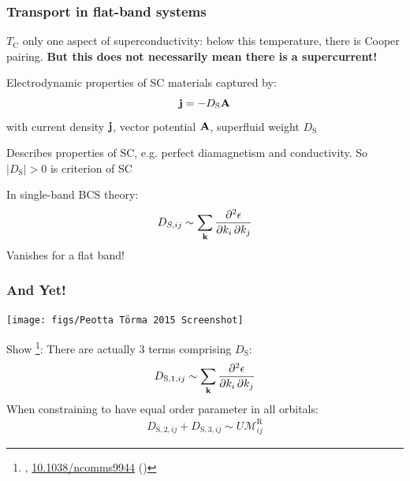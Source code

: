 \documentclass[aspectratio=169]{beamer}
\begin{document}
\begin{frame}
	\frametitle{Transport in flat-band systems}
	
	\(T_{\textrm{C}}\) only one aspect of superconductivity: below this temperature, there is Cooper pairing.
	\textbf{But this does not necessarily mean there is a supercurrent!}
	
	Electrodynamic properties of SC materials captured by:
	\begin{equation}
		\mathbf{j} = -D_{\textrm{S}} \mathbf{A}
	\end{equation}
	with current density \(\mathbf{j}\), vector potential \(\mathbf{A}\), superfluid weight \(D_{\textrm{S}}\)
	
	Describes properties of SC, e.g. perfect diamagnetism and conductivity.
	So \(\vert D_{\textrm{S}} \vert > 0\) is criterion of SC
	
	In single-band BCS theory:
	\begin{equation}
		D_{S, ij} \sim \sum_{\mathbf{k}} \pdv{\epsilon}{k_i,k_j}
	\end{equation}
	Vanishes for a flat band!
\end{frame}


\begin{frame}
	\frametitle{And Yet!}
	
	\begin{center}
		\texttt{[image: figs/Peotta Törma 2015 Screenshot]}
	\end{center}
	
	Show \footnote[frame]{\citeauthor{peottaSuperfluidityTopologicallyNontrivial2015}, \href{https://doi.org/10.1038/ncomms9944}{10.1038/ncomms9944} (\citeyear{peottaSuperfluidityTopologicallyNontrivial2015})}: There are actually 3 terms comprising \(D_{\textrm{S}}\):
	\begin{align}
		D_{\textrm{S}, 1, ij} \sim \sum_{\mathbf{k}} \pdv{\epsilon}{k_i,k_j}
	\end{align}
	When constraining to have equal order parameter in all orbitals:
	\begin{align}
		D_{\textrm{S}, 2, ij} + D_{\textrm{S}, 3, ij} \sim U \mathcal{M}_{ij}^{\textrm{R}}
	\end{align}
\end{frame}
\end{document}
